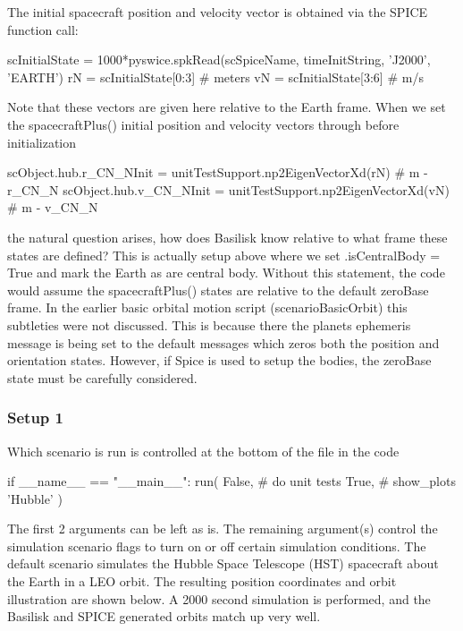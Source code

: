 The initial spacecraft position and velocity vector is obtained via the S\+P\+I\+CE function call\+: 
\begin{DoxyCode}
scInitialState = 1000*pyswice.spkRead(scSpiceName, timeInitString, \textcolor{stringliteral}{'J2000'}, \textcolor{stringliteral}{'EARTH'})
rN = scInitialState[0:3]         \textcolor{comment}{# meters}
vN = scInitialState[3:6]         \textcolor{comment}{# m/s}
\end{DoxyCode}
 Note that these vectors are given here relative to the Earth frame. When we set the spacecraft\+Plus() initial position and velocity vectors through before initialization 
\begin{DoxyCode}
scObject.hub.r\_CN\_NInit = unitTestSupport.np2EigenVectorXd(rN)  \textcolor{comment}{# m - r\_CN\_N}
scObject.hub.v\_CN\_NInit = unitTestSupport.np2EigenVectorXd(vN)  \textcolor{comment}{# m - v\_CN\_N}
\end{DoxyCode}
 the natural question arises, how does Basilisk know relative to what frame these states are defined? This is actually setup above where we set {\ttfamily .is\+Central\+Body = True} and mark the Earth as are central body. Without this statement, the code would assume the spacecraft\+Plus() states are relative to the default zero\+Base frame. In the earlier basic orbital motion script (scenario\+Basic\+Orbit) this subtleties were not discussed. This is because there the planets ephemeris message is being set to the default messages which zero\textquotesingle{}s both the position and orientation states. However, if Spice is used to setup the bodies, the zero\+Base state must be carefully considered.

\subsubsection*{Setup 1 }

Which scenario is run is controlled at the bottom of the file in the code 
\begin{DoxyCode}
\textcolor{keywordflow}{if} \_\_name\_\_ == \textcolor{stringliteral}{"\_\_main\_\_"}:
    run( \textcolor{keyword}{False},       \textcolor{comment}{# do unit tests}
         \textcolor{keyword}{True},        \textcolor{comment}{# show\_plots}
         \textcolor{stringliteral}{'Hubble'}
       )
\end{DoxyCode}
 The first 2 arguments can be left as is. The remaining argument(s) control the simulation scenario flags to turn on or off certain simulation conditions. The default scenario simulates the Hubble Space Telescope (H\+ST) spacecraft about the Earth in a L\+EO orbit. The resulting position coordinates and orbit illustration are shown below. A 2000 second simulation is performed, and the Basilisk and S\+P\+I\+CE generated orbits match up very well.   

